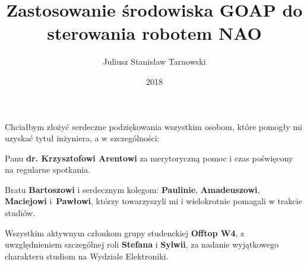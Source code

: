 \documentclass[eng,printmode]{mgr}
\author{Juliusz Stanisław Tarnowski}
\title{Zastosowanie środowiska GOAP do sterowania robotem NAO}
\date{2018}
\begin{document}
\maketitle

\dedication{0.9\textwidth}{
Chciałbym złożyć serdeczne podziękowania wszystkim osobom, które pomogły mi uzyskać tytuł inżyniera, a w szczególności: \par \vskip 0.1in
Panu \textbf{dr. Krzysztofowi Arentowi} za merytoryczną pomoc i czas poświęcony na regularne spotkania. \par \vskip 0.1in
Bratu \textbf{Bartoszowi} i serdecznym kolegom: \textbf{Paulinie}, \textbf{Amadeuszowi}, \textbf{Maciejowi} i~\textbf{Pawłowi}, którzy towarzyszyli mi i wielokrotnie pomagali w trakcie studiów. \par \vskip 0.1in
Wszystkim aktywnym członkom grupy studenckiej \textbf{Offtop W4}, z uwzględnieniem szczególnej roli \textbf{Stefana} i \textbf{Sylwii}, za nadanie wyjątkowego charakteru studiom na Wydziale Elektroniki.}

\tableofcontents







%

{}


\end{document}
